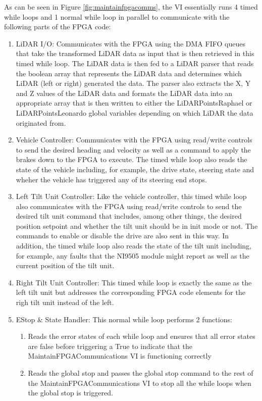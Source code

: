 \noindent As can be seen in Figure \ref{fig:maintainfpgacomms}, the VI essentially runs 4 timed while loops and 1 normal while loop in parallel to communicate with the following parts of the FPGA code:

\begin{enumerate}
\item LiDAR I/O: Communicates with the FPGA using the DMA FIFO queues that take the transformed LiDAR data as input that is then retrieved in this timed while loop. The LiDAR data is then fed to a LiDAR parser that reads the boolean array that represents the LiDAR data and determines which LiDAR (left or right) generated the data. The parser also extracts the X, Y and Z values of the LiDAR data and formats the LiDAR data into an appropriate array that is then written to either the LiDARPointsRaphael or LiDARPointsLeonardo global variables depending on which LiDAR the data originated from.
\item Vehicle Controller: Communicates with the FPGA using read/write controls to send the desired heading and velocity as well as a command to apply the brakes down to the FPGA to execute. The timed while loop also reads the state of the vehicle including, for example, the drive state, steering state and wheher the vehicle has triggered any of its steering end stops.
\item Left Tilt Unit Controller: Like the vehicle controller, this timed while loop also communicates with the FPGA using read/write controls to send the desired tilt unit command that includes, among other things, the desired position setpoint and whether the tilt unit should be in init mode or not. The commands to enable or disable the drive are also sent in this way. In addition, the timed while loop also reads the state of the tilt unit including, for example, any faults that the NI9505 module might report as well as the current position of the tilt unit.
\item Right Tilt Unit Controller: This timed while loop is exactly the same as the left tilt unit but addresses the corresponding FPGA code elements for the righ tilt unit instead of the left.
\item EStop \& State Handler: This normal while loop performs 2 functions:
\begin{enumerate}
\item Reads the error states of each while loop and ensures that all error states are false before triggering a True to indicate that the MaintainFPGACommunications VI is functioning correctly
\item Reads the global stop and passes the global stop command to the rest of the MaintainFPGACommunications VI to stop all the while loops when the global stop is triggered.
\end{enumerate}
\end{enumerate}


